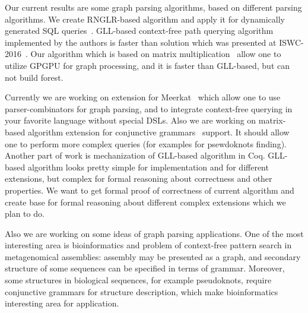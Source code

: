 \documentclass{vldb}
\begin{document}
Our current results are some graph parsing algorithms, based on different parsing algorithms.
We create RNGLR-based algorithm and apply it for dynamically generated SQL queries~\cite{RelaxedRNGLR}.
GLL-based context-free path querying algorithm~\cite{GraphGLL} implemented by the authors is faster than solution which was presented at ISWC-2016~\cite{CFRDFParsing}. 
Our algorithm which is based on matrix multiplication~\cite{GraphParsingMatrix} allow one to utilize GPGPU for graph processing, and it is faster than GLL-based, but can not build forest.

Currently we are working on extension for Meerkat~\cite{Meerkat} which allow one to use parser-combinators for graph parsing, and to integrate context-free querying in your favorite language without special DSLs.
Also we are working on matrix-based algorithm extension for conjunctive grammars~\cite{Okhotin} support.
It should allow one to perform more complex queries (for examples for psewdoknots finding).
Another part of work is mechanization of GLL-based algorithm in Coq.
GLL-based algorithm looks pretty simple for implementation and for different extensions, but 
complex for formal reasoning about correctness and other properties.
We want to get formal proof of correctness of current algorithm and create base for formal reasoning 
about different complex extensions which we plan to do.

Also we are working on some ideas of graph parsing applications.
One of the most interesting area is bioinformatics and problem of context-free pattern search in 
metagenomical assemblies: assembly may be presented as a graph, and secondary structure of some sequences can be specified in terms of grammar.
Moreover, some structures in biological sequences, for example pseudoknots, require conjunctive grammars for structure description, which make bioinformatics interesting area for application.
\end{document}

